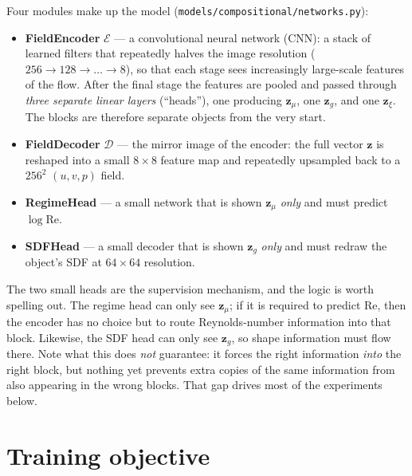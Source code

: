 \documentclass[11pt]{article}
\begin{document}
Four modules make up the model
(\texttt{models/compositional/networks.py}):
%
\begin{itemize}
  \item \textbf{FieldEncoder} $\mathcal{E}$ --- a convolutional neural
        network (CNN): a stack of learned filters that repeatedly halves
        the image resolution ($256 \to 128 \to \dots \to 8$), so that
        each stage sees increasingly large-scale features of the flow.
        After the final stage the features are pooled and passed through
        \emph{three separate linear layers} (``heads''), one producing
        $\boldsymbol{z}_{\mu}$, one $\boldsymbol{z}_{g}$, and one
        $\boldsymbol{z}_{\xi}$. The blocks are therefore separate objects
        from the very start.
  \item \textbf{FieldDecoder} $\mathcal{D}$ --- the mirror image of the
        encoder: the full vector $\boldsymbol{z}$ is reshaped into a
        small $8 \times 8$ feature map and repeatedly upsampled back to a
        $256^2$ $(u, v, p)$ field.
  \item \textbf{RegimeHead} --- a small network that is shown
        $\boldsymbol{z}_{\mu}$ \emph{only} and must predict
        $\log \mathrm{Re}$.
  \item \textbf{SDFHead} --- a small decoder that is shown
        $\boldsymbol{z}_{g}$ \emph{only} and must redraw the object's SDF
        at $64 \times 64$ resolution.
\end{itemize}
%
The two small heads are the supervision mechanism, and the logic is worth
spelling out. The regime head can only see $\boldsymbol{z}_{\mu}$; if it
is required to predict Re, then the encoder has no choice but to route
Reynolds-number information into that block. Likewise, the SDF head can
only see $\boldsymbol{z}_{g}$, so shape information must flow there.
Note what this does \emph{not} guarantee: it forces the right information
\emph{into} the right block, but nothing yet prevents extra copies of the
same information from also appearing in the wrong blocks. That gap drives
most of the experiments below.

\section{Training objective}
\end{document}
